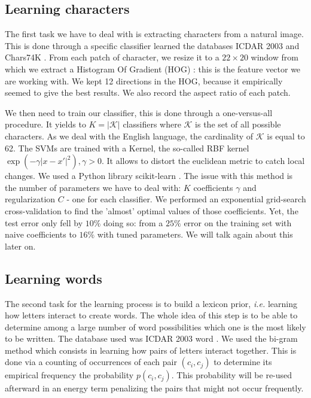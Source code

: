 \documentclass[10pt,a4paper]{article}
\begin{document}
\subsection{Learning characters}

The first task we have to deal with is extracting characters from a natural image. This is done through a specific classifier learned the databases ICDAR 2003 \cite{ICDARchar} and Chars74K \cite{Char74K}. From each patch of character, we resize it to a $22\times 20$ window from which we extract a Histogram Of Gradient (HOG) \cite{Dal2005}: this is the feature vector we are working with. We kept 12 directions in the HOG, because it empirically seemed to give the best results. We also record the aspect ratio of each patch. 

We then need to train our classifier, this is done through a one-versus-all procedure. It yields to $K = |\mathcal{K}|$ classifiers where $\mathcal{K}$ is the set of all possible characters. As we deal with the English language, the cardinality of $\mathcal{K}$ is equal to 62. The SVMs are trained with a Kernel, the so-called RBF kernel $\exp(-\gamma |x-x'|^2), \gamma > 0$. It allows to distort the euclidean metric to catch local changes. We used a Python library scikit-learn \cite{scikit}. The issue with this method is the number of parameters we have to deal with: $K$ coefficients $\gamma$ and regularization $C$ - one for each classifier. We performed an exponential grid-search cross-validation to find the 'almost' optimal values of those coefficients. Yet, the test error only fell by $10\%$ doing so: from a $25\%$ error on the training set with naive coefficients to $16\%$ with tuned parameters. We will talk again about this later on. 


\subsection{Learning words}

The second task for the learning process is to build a lexicon prior, \emph{i.e.} learning how letters interact to create words. The whole idea of this step is to be able to determine among a large number of word possibilities which one is the most likely to be written. The database used was ICDAR 2003 word \cite{ICDARword}. We used the bi-gram method which consists in learning how pairs of letters interact together. This is done via a counting of occurrences of each pair $(c_i,c_j)$ to determine its empirical frequency the probability $p(c_i,c_j)$. This probability will be re-used afterward in an energy term penalizing the pairs that might not occur frequently. 
\end{document}
